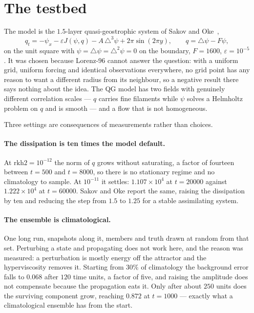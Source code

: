 \documentclass[11pt,a4paper]{article}
\theoremstyle{definition}
\begin{document}
\section{The testbed}

The model is the $1.5$-layer quasi-geostrophic system of Sakov and
Oke~\cite{sakov2008},
%
\begin{equation}
  q_t = -\psi_x - \varepsilon J(\psi, q) - A\,\triangle^{3}\psi
        + 2\pi \sin(2\pi y), \qquad q = \triangle\psi - F\psi,
\end{equation}
%
on the unit square with $\psi = \triangle\psi = \triangle^2\psi = 0$ on the
boundary, $F = 1600$, $\varepsilon = 10^{-5}$. It was chosen because Lorenz-96
cannot answer the question: with a uniform grid, uniform forcing and identical
observations everywhere, no grid point has any reason to want a different radius
from its neighbour, so a negative result there says nothing about the idea. The
QG model has two fields with genuinely different correlation scales --- $q$
carries fine filaments while $\psi$ solves a Helmholtz problem on $q$ and is
smooth --- and a flow that is not homogeneous.

Three settings are consequences of measurements rather than choices.

\paragraph{The dissipation is ten times the model default.}
At $\mathrm{rkh2} = 10^{-12}$ the norm of $q$ grows without saturating, a factor
of fourteen between $t = 500$ and $t = 8000$, so there is no stationary regime
and no climatology to sample. At $10^{-11}$ it settles: $1.107 \times 10^{4}$ at
$t = 20000$ against $1.222 \times 10^{4}$ at $t = 60000$. Sakov and Oke report
the same, raising the dissipation by ten and reducing the step from $1.5$ to
$1.25$ for a stable assimilating system.

\paragraph{The ensemble is climatological.}
One long run, snapshots along it, members and truth drawn at random from that
set. Perturbing a state and propagating does not work here, and the reason was
measured: a perturbation is mostly energy off the attractor and the
hyperviscosity removes it. Starting from $30\%$ of climatology the background
error falls to $0.068$ after $120$ time units, a factor of five, and raising the
amplitude does not compensate because the propagation eats it. Only after about
$250$ units does the surviving component grow, reaching $0.872$ at $t = 1000$ ---
exactly what a climatological ensemble has from the start.
\end{document}
